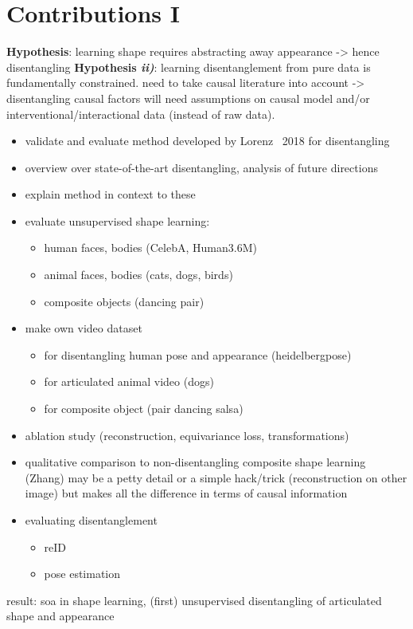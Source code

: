\section{Contributions I}
	\textbf{Hypothesis}: learning shape requires abstracting away appearance -> hence disentangling
	\textbf{Hypothesis \emph{ii)}}: learning disentanglement from pure data is fundamentally constrained. need to take causal literature into account -> disentangling causal factors will need assumptions on causal model and/or interventional/interactional data (instead of raw data).
	\begin{itemize}
		\item validate and evaluate method developed by Lorenz \etal\ 2018 for disentangling
		\item overview over state-of-the-art disentangling, analysis of future directions
		\item explain method in context to these
		\item evaluate unsupervised shape learning:
			\begin{itemize}
				\item human faces, bodies (CelebA, Human3.6M)
				\item animal faces, bodies (cats, dogs, birds)
				\item composite objects (dancing pair)
			\end{itemize}
		\item make own video dataset
			\begin{itemize}
				\item for disentangling human pose and appearance (heidelbergpose)
				\item for articulated animal video (dogs)
				\item for composite object (pair dancing salsa)
			\end{itemize}
		\item ablation study (reconstruction, equivariance loss, transformations)
		\item qualitative comparison to non-disentangling composite shape learning (Zhang)
		may be a petty detail or a simple hack/trick (reconstruction on other image) but makes all the difference in terms of causal information
		\item evaluating disentanglement
			\begin{itemize}
				\item reID
				\item pose estimation
			\end{itemize}
	\end{itemize}
	result: soa in shape learning, (first) unsupervised disentangling of articulated shape and appearance

